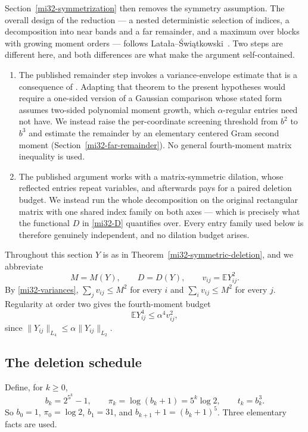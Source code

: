 \documentclass[11pt]{article}
\theoremstyle{definition}
\theoremstyle{remark}
\newcommand{\E}{\mathbb E}
\newcommand{\norm}[1]{\lVert#1\rVert}
\begin{document}
Section~\ref{mi32-symmetrization} then removes the symmetry assumption.
The overall design of the reduction --- a nested deterministic selection
of indices, a decomposition into near bands and a far remainder, and a
maximum over blocks with growing moment orders --- follows
Lata\l a--\'Swi\k atkowski\ \cite[Remark~4.5]{LatalaSwiatkowski}. Two
steps are different here, and both differences are what make the
argument self-contained.

\begin{enumerate}
\item The published remainder step invokes a variance-envelope estimate
that is a consequence of
\cite[Theorem~4.4]{LatalaVanHandelYoussef}. Adapting that theorem to
the present hypotheses would require a one-sided version of a Gaussian
comparison whose stated form assumes two-sided polynomial moment
growth, which $\alpha$-regular entries need not have. We instead raise
the per-coordinate screening threshold from $b^2$ to $b^3$ and estimate
the remainder by an elementary centered Gram second moment
(Section~\ref{mi32-far-remainder}). No general fourth-moment matrix
inequality is used.
\item The published argument works with a matrix-symmetric dilation,
whose reflected entries repeat variables, and afterwards pays for a
paired deletion budget. We instead run the whole decomposition on the
original rectangular matrix with one shared index family on both axes
--- which is precisely what the functional $D$ in \eqref{mi32-D}
quantifies over. Every entry family used below is therefore genuinely
independent, and no dilation budget arises.
\end{enumerate}

Throughout this section $Y$ is as in
Theorem~\ref{mi32-symmetric-deletion}, and we abbreviate
\[
 M=M(Y),\qquad D=D(Y),\qquad v_{ij}=\E Y_{ij}^2 .
\]
By \eqref{mi32-variances}, $\sum_jv_{ij}\le M^2$ for every $i$ and
$\sum_iv_{ij}\le M^2$ for every $j$. Regularity at order two gives the
fourth-moment budget
\begin{equation}\label{mi32-fourth-budget}
 \E Y_{ij}^4\le\alpha^4v_{ij}^2 ,
\end{equation}
since $\norm{Y_{ij}}_{L_4}\le\alpha\norm{Y_{ij}}_{L_2}$.

\subsection{The deletion schedule}
\label{mi32-schedule}

Define, for $k\ge0$,
\begin{equation}\label{mi32-schedule-def}
 b_k=2^{5^k}-1,\qquad
 \pi_k=\log(b_k+1)=5^k\log2,\qquad
 t_k=b_k^3 .
\end{equation}
So $b_0=1$, $\pi_0=\log2$, $b_1=31$, and $b_{k+1}+1=(b_k+1)^5$.
Three elementary facts are used.
\end{document}
